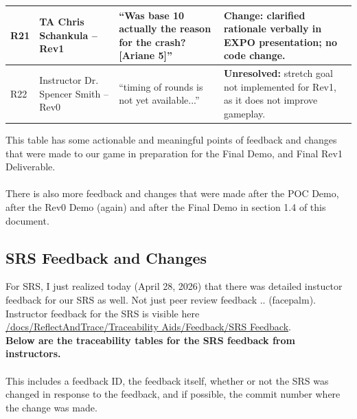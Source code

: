 \documentclass{article}
\begin{document}
\begin{longtable}{p{} p{} p{} p{}}
R21 & TA Chris Schankula -- Rev1 & ``Was base 10 actually the reason for the crash? [Ariane 5]'' & \textbf{Change:} clarified rationale verbally in EXPO presentation; no code change. \\
\midrule

R22 & Instructor Dr. Spencer Smith -- Rev0 & ``timing of rounds is not yet available...'' & \textbf{Unresolved:} stretch goal not implemented for Rev1, as it does not improve gameplay. \\

\end{longtable}

This table has some actionable and meaningful points of feedback and changes 
that were made to our game in preparation for the Final Demo, and Final Rev1 Deliverable.\\\\

There is also more feedback and changes that were made after the POC Demo, 
after the Rev0 Demo (again) and after the Final Demo in section 1.4 
of this document.

\subsection{SRS Feedback and Changes}

For SRS, I just realized today (April 28, 2026) that there was detailed instuctor feedback for our SRS as well. Not just peer review feedback .. (facepalm).
Instructor feedback for the SRS is visible here \href{https://github.com/The-Crazy-Four-Games/Crazy_1-0s_Game/blob/reflect/docs/ReflectAndTrace/Traceability%20Aids/Feedback/SRS%20Feedback%20for%20SRS%20-%20SFWRENG%204G06A%3ASoftware%20Design%20IV%20-%20Capstone%20Design%20Project%20-%20McMaster%20University.pdf}{/docs/ReflectAndTrace/Traceability Aids/Feedback/SRS Feedback}.\\

\textbf{Below are the traceability tables for the SRS feedback from instructors.}\\\\
This includes a feedback ID, the feedback itself, whether or not the SRS was changed in response to the feedback, and if possible, the commit number where the change was made.
\end{document}
